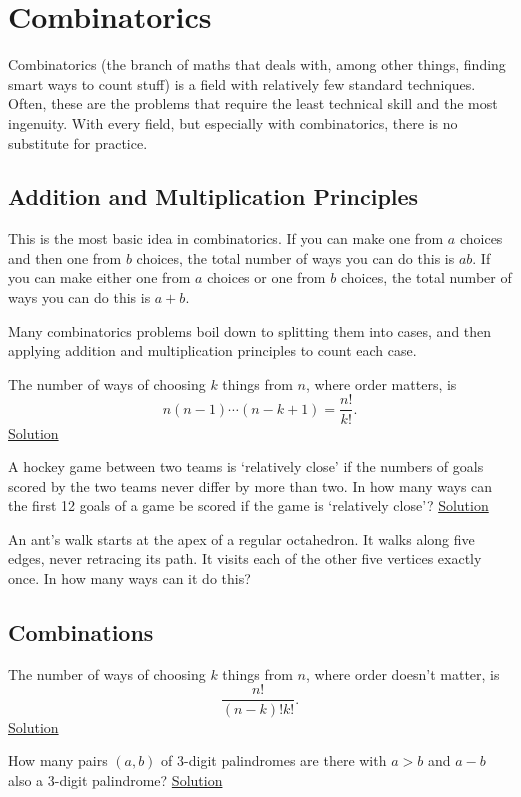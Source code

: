 \section{Combinatorics}
Combinatorics (the branch of maths that deals with, among other things, finding
smart ways to count stuff) is a field with relatively few standard techniques.
Often, these are the problems that require the least technical skill and the
most ingenuity. With every field, but especially with combinatorics, there is no
substitute for practice.
\subsection{Addition and Multiplication Principles}
This is the most basic idea in combinatorics. If you can make one from $a$
choices and then one from $b$ choices, the total number of ways you can do this
is $ab$. If you can make either one from $a$ choices or one from $b$ choices,
the total number of ways you can do this is $a+b$.

Many combinatorics problems boil down to splitting them into cases, and
then applying addition and multiplication principles to count each case.
\begin{result}[Permutations]\label{r:b:c:am:1}
  The number of ways of choosing $k$ things from $n$, where order matters, is
  \[n(n-1)\cdots(n-k+1)=\frac{n!}{k!}.\]
  \hyperlink{sr:b:c:am:1}{Solution}
\end{result}
\begin{problem}\label{p:b:c:am:1}
  A hockey game between two teams is `relatively close' if the numbers of goals
  scored by the two teams never differ by more than two. In how many ways can
  the first 12 goals of a game be scored if the game is `relatively close'?
  \hyperlink{sp:b:c:am:1}{Solution}
\end{problem}
\begin{problem}\label{p:b:c:am:2}
  An ant's walk starts at the apex of a regular octahedron. It walks along five
  edges, never retracing its path. It visits each of the other five vertices
  exactly once. In how many ways can it do this?
\end{problem}
\subsection{Combinations}
\begin{result}[Combinations]\label{r:b:c:c:1}
  The number of ways of choosing $k$ things from $n$, where order doesn't
  matter, is \[\frac{n!}{(n-k)!k!}.\]
  \hyperlink{sr:b:c:c:1}{Solution}
\end{result}
\begin{problem}{\label{p:b:c:c:1}}
  How many pairs $(a,b)$ of 3-digit palindromes are there with $a>b$ and
  $a-b$ also a 3-digit palindrome?
  \hyperlink{sp:b:c:c:1}{Solution}
\end{problem}
